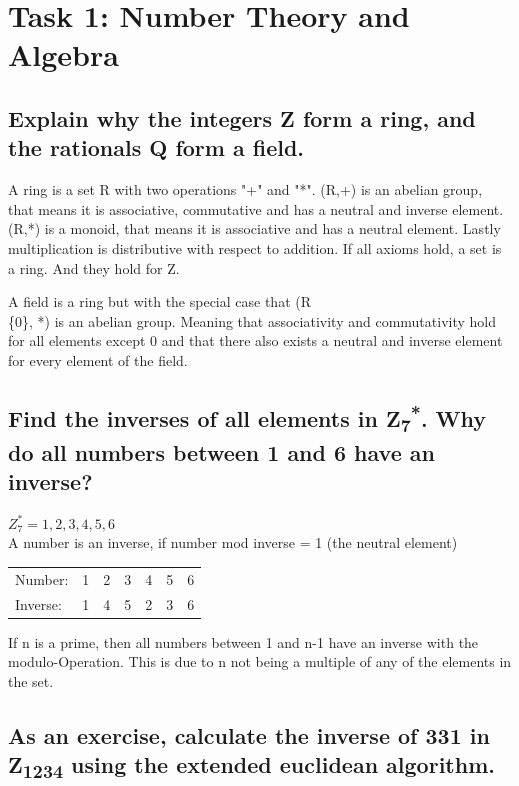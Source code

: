 \section{Task 1: Number Theory and Algebra}

\subsection{Explain why the integers Z form a ring, and the rationals Q form a field.}


A ring is a set R with two operations "+" and "*". (R,+) is an abelian group, that means it is associative, commutative and has a neutral and inverse element. (R,*) is a monoid, that means it is associative and has a neutral element. Lastly multiplication is distributive with respect to addition. If all axioms hold, a set is a ring. And they hold for Z.


A field is a ring but with the special case that (R \\\{0\}, *) is an abelian group. Meaning that associativity and commutativity hold for all elements except 0 and that there also exists a neutral and inverse element for every element of the field.

\subsection{Find the inverses of all elements in Z\textsubscript{7}\textsuperscript{*}. Why do all numbers between 1 and 6 have an inverse?}

$Z^*_7 = {1,2,3,4,5,6}$\\
A number is an inverse, if number mod inverse = 1 (the neutral element)

\begin{tabular}{l c c c c c c}
	Number: & 1 & 2 & 3 & 4 & 5 & 6\\
	Inverse: & 1 & 4 & 5 & 2 & 3 & 6\\
\end{tabular}

If n is a prime, then all numbers between 1 and n-1 have an inverse with the modulo-Operation. This is due to n not being a multiple of any of the elements in the set.

\subsection{As an exercise, calculate the inverse of 331 in Z\textsubscript{1234} using the extended euclidean algorithm.}

